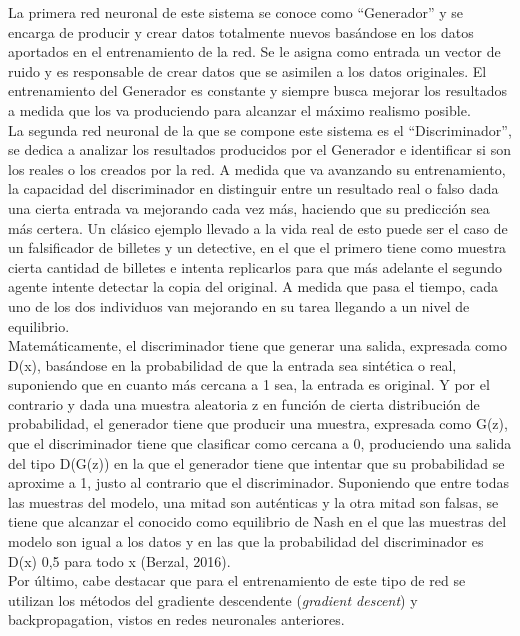 La primera red neuronal de este sistema se conoce como “Generador” y se encarga de producir y crear datos totalmente nuevos basándose en los datos aportados en el entrenamiento de la red. Se le asigna como entrada un vector de ruido y es responsable de crear datos que se asimilen a los datos originales. El entrenamiento del Generador es constante y siempre busca mejorar los resultados a medida que los va produciendo para alcanzar el máximo realismo posible. \\

La segunda red neuronal de la que se compone este sistema es el “Discriminador”, se dedica a analizar los resultados producidos por el Generador e identificar si son los reales o los creados por la red. A medida que va avanzando su entrenamiento, la capacidad del discriminador en distinguir entre un resultado real o falso dada una cierta entrada va mejorando cada vez más, haciendo que su predicción sea más certera. 
Un clásico ejemplo llevado a la vida real de esto puede ser el caso de un falsificador de billetes y un detective, en el que el primero tiene como muestra cierta cantidad de billetes e intenta replicarlos para que más adelante el segundo agente intente detectar la copia del original. A medida que pasa el tiempo, cada uno de los dos individuos van mejorando en su tarea llegando a un nivel de equilibrio. \\

Matemáticamente, el discriminador tiene que generar una salida, expresada como D(x), basándose en la probabilidad de que la entrada sea sintética o real, suponiendo que en cuanto más cercana a 1 sea, la entrada es original. Y por el contrario y dada una muestra aleatoria z en función de cierta distribución de probabilidad, el generador tiene que producir una muestra, expresada como G(z), que el discriminador tiene que clasificar como cercana a 0, produciendo una salida del tipo D(G(z)) en la que el generador tiene que intentar que su probabilidad se aproxime a 1, justo al contrario que el discriminador. Suponiendo que entre todas las muestras del modelo, una mitad son auténticas y la otra mitad son falsas, se tiene que alcanzar el conocido como equilibrio de Nash en el que las muestras del modelo son igual a los datos y en las que la probabilidad del discriminador es D(x) 0,5 para todo x (Berzal, 2016). \\

Por último, cabe destacar que para el entrenamiento de este tipo de red se utilizan los métodos del gradiente descendente (\textit{gradient descent}) y backpropagation, vistos en redes neuronales anteriores. \\

